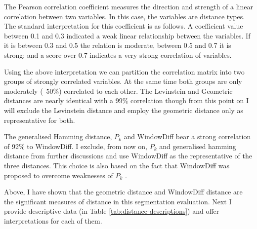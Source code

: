     The Pearson correlation coefficient measures the direction and strength of a linear correlation between two variables. In this case, the variables are distance types. The standard interpretation for this coefficient is as follows. A coefficient value between 0.1 and 0.3 indicated a weak linear relationship between the variables. If it is between 0.3 and 0.5 the relation is moderate, between 0.5 and 0.7 it is strong; and a score over 0.7 indicates a very strong correlation of variables. 
    
    Using the above interpretation we can partition the correlation matrix into two groups of strongly correlated variables. At the same time both groups are only moderately (~50\%) correlated to each other. The Levinstein and Geometric distances are nearly identical with a 99\% correlation though from this point on I will exclude the Levinstein distance and employ the geometric distance only as representative for both. 
    
    The generalised Hamming distance, $P_k$ and WindowDiff bear a strong correlation of 92\% to WindowDiff. I exclude, from now on, $P_k$ and generalised hamming distance from further discussions and use WindowDiff as the representative of the three distances. This choice is also based on the fact that WindowDiff was proposed to overcome weaknesses of $P_k$ \citep[10]{pevzner2002critique}.
    
    Above, I have shown that the geometric distance and WindowDiff distance are the significant measures of distance in this segmentation evaluation. Next I provide descriptive data (in Table \ref{tab:distance-descriptions}) and offer interpretations for each of them.
    
    \begin{table}[!ht]
    \centering
    \caption{Descriptive statistics for each set of distance measurements between corpus and parser segments}
    \label{tab:distance-descriptions}
    \end{table}

